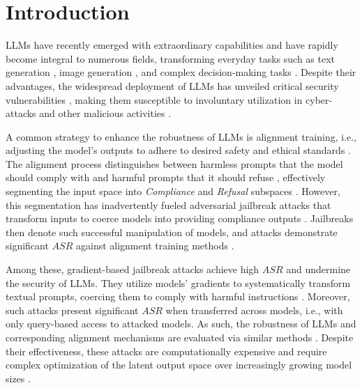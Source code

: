 

\section{Introduction}
\label{section:intro}

LLMs have recently emerged with extraordinary capabilities \cite{waswani2017attention,lewis2020retrieval, ahn2022can, hadi2023large} and have rapidly become integral to numerous fields, transforming everyday tasks such as text generation \cite{touvron2023llama,chiang2023vicuna,jiang2023mistral, achiam2023gpt}, image generation \cite{saharia2022photorealistic, nichol2021glide}, and complex decision-making tasks \cite{topsakal2023creating, wu2023autogen}. Despite their advantages, the widespread deployment of LLMs has unveiled critical security vulnerabilities \cite{perez2022ignore, wan2023poisoning}, making them susceptible to involuntary utilization in cyber-attacks and other malicious activities \cite{fang2024llm, yao2024survey}.

A common strategy to enhance the robustness of LLMs is alignment training, i.e., adjusting the model’s outputs to adhere to desired safety and ethical standards \cite{shen2023large, wu2024meta, wang2023aligning, lee2023rlaif}. The alignment process distinguishes between harmless prompts that the model should comply with and harmful prompts that it should refuse \cite{glaese2022improving,wang2020understanding}, effectively segmenting the input space into \emph{Compliance} and \emph{Refusal} subspaces \cite{yu2024enhancing}. However, this segmentation has inadvertently fueled adversarial jailbreak attacks that transform inputs to coerce models into providing compliance outputs \cite{marshall2024refusal,baumann2024universal,huang2024stronger,yu2024robust}. Jailbreaks then denote such successful manipulation of models, and attacks demonstrate significant $ASR$ against alignment training methods \cite{chao2023jailbreaking,deng2023jailbreaker}. 

Among these, gradient-based jailbreak attacks achieve high $ASR$ and undermine the security of LLMs. They utilize models' gradients to systematically transform textual prompts, coercing them to comply with harmful instructions \cite{zou2023universal,liu2023autodan,zheng2024jailbreaking}. Moreover, such attacks present significant $ASR$ when transferred across models, i.e., with only query-based access to attacked models. As such, the robustness of LLMs and corresponding alignment mechanisms are evaluated via similar methods \cite{mazeika2024harmbench,zhou2024defending}. Despite their effectiveness, these attacks are computationally expensive and require complex optimization of the latent output space over increasingly growing model sizes \cite{tao2024scaling,dubey2024llama}.


